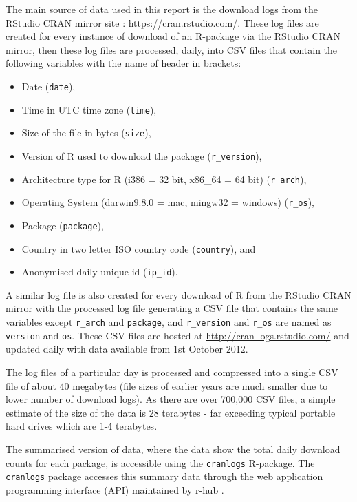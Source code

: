 \documentclass[
]{book}
\providecommand{\tightlist}{%
  \setlength{\itemsep}{0pt}\setlength{\parskip}{0pt}}
\begin{document}
The main source of data used in this report is the download logs from the RStudio CRAN mirror site : \url{https://cran.rstudio.com/}. These log files are created for every instance of download of an R-package via the RStudio CRAN mirror, then these log files are processed, daily, into CSV files that contain the following variables with the name of header in brackets:

\begin{itemize}
\tightlist
\item
  Date (\texttt{date}),
\item
  Time in UTC time zone (\texttt{time}),
\item
  Size of the file in bytes (\texttt{size}),
\item
  Version of R used to download the package (\texttt{r\_version}),
\item
  Architecture type for R (i386 = 32 bit, x86\_64 = 64 bit) (\texttt{r\_arch}),
\item
  Operating System (darwin9.8.0 = mac, mingw32 = windows) (\texttt{r\_os}),
\item
  Package (\texttt{package}),
\item
  Country in two letter ISO country code (\texttt{country}), and
\item
  Anonymised daily unique id (\texttt{ip\_id}).
\end{itemize}

A similar log file is also created for every download of R from the RStudio CRAN mirror with the processed log file generating a CSV file that contains the same variables except \texttt{r\_arch} and \texttt{package}, and \texttt{r\_version} and \texttt{r\_os} are named as \texttt{version} and \texttt{os}. These CSV files are hosted at \url{http://cran-logs.rstudio.com/} and updated daily with data available from 1st October 2012.

The log files of a particular day is processed and compressed into a single CSV file of about 40 megabytes (file sizes of earlier years are much smaller due to lower number of download logs). As there are over 700,000 CSV files, a simple estimate of the size of the data is 28 terabytes - far exceeding typical portable hard drives which are 1-4 terabytes.

The summarised version of data, where the data show the total daily download counts for each package, is accessible using the \texttt{cranlogs} R-package. The \texttt{cranlogs} package accesses this summary data through the web application programming interface (API) maintained by r-hub \citep{rhub}.
\end{document}
